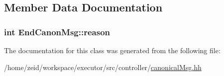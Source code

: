\subsection{Member Data Documentation}
\hypertarget{class_end_canon_msg_a80f182724d15f5994b0231bd40dee9e7}{
\subsubsection[{reason}]{\setlength{\rightskip}{0pt plus 5cm}int {\bf EndCanonMsg::reason}}}
\label{class_end_canon_msg_a80f182724d15f5994b0231bd40dee9e7}


The documentation for this class was generated from the following file:\begin{DoxyCompactItemize}
\item 
/home/zeid/workspace/executor/src/controller/\hyperlink{canonical_msg_8hh}{canonicalMsg.hh}\end{DoxyCompactItemize}
